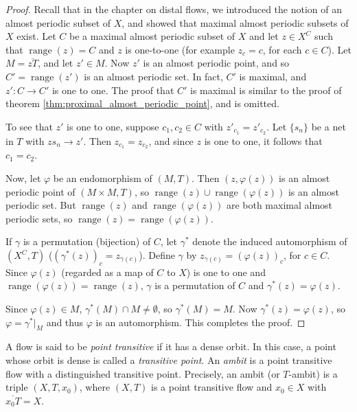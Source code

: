 \begin{proof}
    Recall that in the chapter on distal flows, we introduced the notion of an almost periodic subset of $X$, and showed that maximal almost periodic subsets of $X$ exist. Let $C$ be a maximal almost periodic subset of $X$ and let $z \in X^C$ such that $\operatorname{range}(z)=C$ and $z$ is one-to-one (for example $z_c=c$, for each $c \in C$). Let $M=\overline{zT}$, and let $z' \in M$. Now $z'$ is an almost periodic point, and so $C'=\operatorname{range}(z')$ is an almost periodic set. In fact, $C'$ is maximal, and $z' : C \to C'$ is one to one. The proof that $C'$ is maximal is similar to the proof of theorem \ref{thm:proximal_almost_periodic_point}, and is omitted.

    To see that $z'$ is one to one, suppose $c_1,c_2 \in C$ with $z'_{c_1}=z'_{c_2}$. Let $\{s_n\}$ be a net in $T$ with $z s_n \to z'$. Then $z_{c_1}=z_{c_2}$, and since $z$ is one to one, it follows that $c_1=c_2$.

    Now, let $\varphi$ be an endomorphism of $(M,T)$. Then $(z,\varphi(z))$ is an almost periodic point of $(M\times M,T)$, so $\operatorname{range}(z)\cup \operatorname{range}(\varphi(z))$ is an almost periodic set. But $\operatorname{range}(z)$ and $\operatorname{range}(\varphi(z))$ are both maximal almost periodic sets, so $\operatorname{range}(z)=\operatorname{range}(\varphi(z))$.

    If $\gamma$ is a permutation (bijection) of $C$, let $\gamma^*$ denote the induced automorphism of $(X^C,T)$ ($( \gamma^*(z) )_c = z_{\gamma(c)}$). Define $\gamma$ by $z_{\gamma(c)} = (\varphi(z))_c$, for $c \in C$. Since $\varphi(z)$ (regarded as a map of $C$ to $X$) is one to one and $\operatorname{range}(\varphi(z))=\operatorname{range}(z)$, $\gamma$ is a permutation of $C$ and $\gamma^*(z)=\varphi(z)$.

    Since $\varphi(z) \in M$, $\gamma^*(M)\cap M \neq \emptyset$, so $\gamma^*(M)=M$. Now $\gamma^*(z)=\varphi(z)$, so $\varphi=\gamma^*|_M$ and thus $\varphi$ is an automorphism. This completes the proof.
\end{proof}



A flow is said to be \emph{point transitive} if it has a dense orbit. In this case, a point whose orbit is dense is called a \emph{transitive point}. An \emph{ambit} is a point transitive flow with a distinguished transitive point. Precisely, an ambit (or $T$-ambit) is a triple $(X,T,x_0)$, where $(X,T)$ is a point transitive flow and $x_0 \in X$ with $\overline{x_0 T}=X$.

